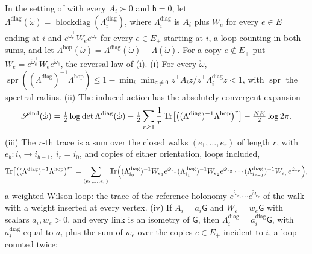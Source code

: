 In the setting of  with every \(A_i\succ0\) and \(\mathsf h=0\), let
\(\Lambda^{\mathrm{diag}}(\mathring\omega)=\operatorname{blockdiag}(\Lambda^{\mathrm{diag}}_i)\), where
\(\Lambda^{\mathrm{diag}}_i\) is \(A_i\) plus \(W_e\) for every \(e\in E_+\) ending at \(i\) and
\(e^{\mathring\omega_e^\top}W_ee^{\mathring\omega_e}\) for every \(e\in E_+\) starting at \(i\), a loop counting in
both sums, and let \(\Lambda^{\mathrm{hop}}(\mathring\omega)=\Lambda^{\mathrm{diag}}(\mathring\omega)-\Lambda(\mathring\omega)\).
For a copy \(e\notin E_+\) put \(W_e=e^{\mathring\omega_{\bar e}^\top}W_{\bar e}e^{\mathring\omega_{\bar e}}\), the
reversal law of (i).
(i) For every \(\mathring\omega\),
\(\operatorname{spr}((\Lambda^{\mathrm{diag}})^{-1}\Lambda^{\mathrm{hop}})
\leq1-\min_i\min_{z\neq0}z^\top A_iz/z^\top\Lambda^{\mathrm{diag}}_iz<1\), with \(\operatorname{spr}\) the
spectral radius.
(ii) The induced action has the absolutely convergent expansion
\begin{equation}
\mathscr S^{\mathrm{ind}}(\mathring\omega)
=\tfrac12\log\det\Lambda^{\mathrm{diag}}(\mathring\omega)
-\tfrac12\sum_{r\geq1}\frac1r\operatorname{Tr}\bigl[\bigl((\Lambda^{\mathrm{diag}})^{-1}\Lambda^{\mathrm{hop}}\bigr)^r\bigr]-\tfrac{NK}2\log2\pi .
\label{eq:glink-hopping}
\end{equation}
(iii) The \(r\)-th trace is a sum over the closed walks \((e_1,\ldots,e_r)\) of length \(r\), with
\(e_b:i_b\to i_{b-1}\), \(i_r=i_0\), and copies of either orientation, loops included,
\begin{equation}
\operatorname{Tr}\bigl[\bigl((\Lambda^{\mathrm{diag}})^{-1}\Lambda^{\mathrm{hop}}\bigr)^r\bigr]
=\sum_{(e_1,\ldots,e_r)}\operatorname{Tr}\Bigl((\Lambda^{\mathrm{diag}}_{i_0})^{-1}W_{e_1}e^{\mathring\omega_{e_1}}(\Lambda^{\mathrm{diag}}_{i_1})^{-1}W_{e_2}e^{\mathring\omega_{e_2}}\cdots
(\Lambda^{\mathrm{diag}}_{i_{r-1}})^{-1}W_{e_r}e^{\mathring\omega_{e_r}}\Bigr),
\label{eq:glink-walk-sum}
\end{equation}
a weighted Wilson loop: the trace of the reference holonomy
\(e^{\mathring\omega_{e_1}}\cdots e^{\mathring\omega_{e_r}}\) of the walk with a weight inserted at every vertex.
(iv) If \(A_i=a_i\mathsf G\) and \(W_e=w_e\mathsf G\) with scalars \(a_i,w_e>0\), and every link is an
isometry of \(\mathsf G\), then \(\Lambda^{\mathrm{diag}}_i=a^{\mathrm{diag}}_i\mathsf G\), with \(a^{\mathrm{diag}}_i\) equal to
\(a_i\) plus the sum of \(w_e\) over the copies \(e\in E_+\) incident to \(i\), a loop counted twice;
